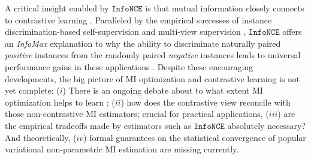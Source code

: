 \documentclass{article}
\theoremstyle{plain}
\theoremstyle{definition}
\theoremstyle{remark}
\newcommand{\infonce}{\texttt{InfoNCE}}
\newcommand{\FLO}{\texttt{FLO}}
\begin{document}
	A critical insight enabled by $\infonce$ is that mutual information closely connects to contrastive learning \citep{gutmann2010noise, oord2018representation}. Paralleled by the empirical successes of instance discrimination-based self-supervision \citep{mnih2013learning, wu2018unsupervised, chen2020simple, he2020momentum} and multi-view supervision \citep{tian2019contrastive, radford2021learning}, $\infonce$ offers an {\it InfoMax} explanation to why the ability to discriminate naturally paired {\it positive} instances from the randomly paired {\it negative} instances leads to universal performance gains in these applications \citep{linsker1988self, shwartz2017opening, poole2019variational}. Despite these encouraging developments, the big picture of MI optimization and contrastive learning is not yet complete: ($i$) There is an ongoing debate about to what extent MI optimization helps to learn \citep{tschannen2020mutual}; ($ii$) how does the contrastive view reconcile with those non-contrastive MI estimators; crucial for practical applications, ($iii$) are the empirical tradeoffs made by estimators such as $\infonce$ absolutely necessary? And theoretically, ($iv$) formal guarantees on the statistical convergence of popular variational non-parametric MI estimation are missing currently. 
	
	
	
\end{document}
